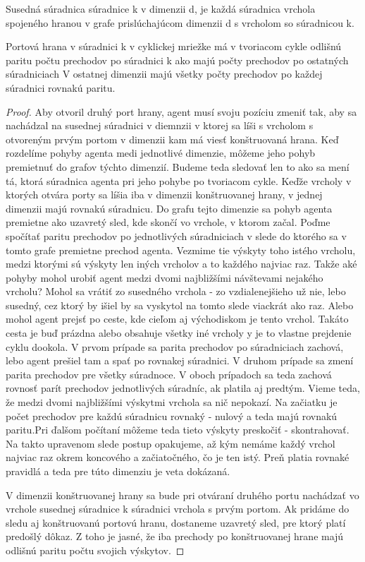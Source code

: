 \begin{ozn}
Susedná súradnica súradnice k v dimenzii d, je každá súradnica vrchola
spojeného hranou v grafe prislúchajúcom dimenzii d s vrcholom so súradnicou
k.
\end{ozn}



\begin{veta}
Portová hrana v súradnici k v cyklickej mriežke má v tvoriacom cykle 
odlišnú paritu počtu prechodov po súradnici k ako majú počty prechodov 
po ostatných súradniciach
V ostatnej dimenzii majú všetky počty prechodov po každej súradnici 
rovnakú paritu.
\end{veta}
\begin{proof}
Aby otvoril druhý port hrany, agent musí svoju pozíciu zmeniť tak, 
aby sa nachádzal na susednej súradnici v diemnzii v ktorej sa líši s
vrcholom s otvoreným prvým portom v dimenzii kam má viesť konštruovaná hrana.
Keď rozdelíme pohyby agenta medi jednotlivé dimenzie, môžeme jeho pohyb
premietnuť do grafov týchto dimenzií. Budeme teda sledovať len to ako sa
mení tá, ktorá súradnica agenta pri jeho pohybe po tvoriacom cykle.
Keďže vrcholy v ktorých otvára porty sa líšia iba v dimenzii konštruovanej
hrany, v jednej dimenzii majú rovnakú súradnicu. Do grafu tejto dimenzie sa
pohyb agenta premietne ako uzavretý sled, kde skončí vo vrchole, v ktorom
začal.
Poďme spočítať paritu prechodov po jednotlivých súradniciach v slede do
ktorého sa v tomto grafe premietne prechod agenta.  Vezmime tie výskyty toho
istého vrcholu, medzi ktorými sú výskyty len iných vrcholov a to každého 
najviac raz. Takže aké pohyby mohol urobiť agent medzi dvomi najbližšími
návštevami nejakého vrcholu? Mohol sa vrátiť zo susedného vrchola - zo
vzdialenejšieho už nie, lebo susedný, cez ktorý by išiel by sa vyskytol na
tomto slede viackrát ako raz. 
Alebo mohol agent prejsť po ceste, kde cieľom
aj východiskom je tento vrchol. Takáto cesta je buď prázdna alebo obsahuje
všetky iné vrcholy y je to vlastne prejdenie cyklu dookola.
V prvom prípade sa parita prechodov po súradniciach zachová, lebo agent
prešiel tam a spať po rovnakej súradnici. V druhom prípade sa zmení parita
prechodov pre všetky súradnoce. V oboch prípadoch sa teda zachová rovnosť
parít prechodov jednotlivých súradníc, ak platila aj predtým. 
Vieme teda, že medzi dvomi najbližšími výskytmi vrchola sa nič nepokazí. Na
začiatku je počet prechodov pre každú súradnicu rovnaký - nulový a teda majú
rovnakú paritu.Pri ďalšom počítaní môžeme teda tieto výskyty preskočiť -
skontrahovať. Na takto upravenom slede postup opakujeme, až kým nemáme každý
vrchol najviac raz okrem koncového a začiatočného, čo je ten istý. Preň
platia rovnaké pravidlá a teda pre túto dimenziu je veta dokázaná.


V dimenzii konštruovanej hrany sa bude pri otváraní druhého portu nachádzať
vo vrchole susednej súradnice k súradnici vrchola s prvým portom.
Ak pridáme do sledu aj konštruovanú portovú hranu, dostaneme uzavretý sled, pre ktorý
platí predošlý dôkaz. Z toho je jasné, že iba prechody po konštruovanej
hrane majú odlišnú paritu počtu svojich výskytov.
\end{proof}



